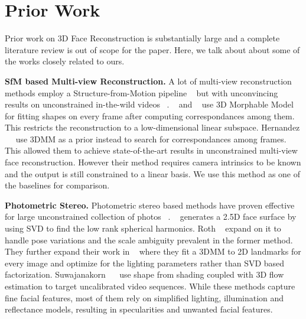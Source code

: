 \documentclass[10pt,twocolumn,letterpaper]{article}
\begin{document}
\section{Prior Work}
Prior work on 3D Face Reconstruction is substantially large and a complete literature review is out of scope for the paper. Here, we talk about about some of the works closely related to ours.

\noindent \textbf{SfM based Multi-view Reconstruction.} A lot of multi-view reconstruction methods employ a Structure-from-Motion pipeline ~\cite{gotardo2015photogeometric, lin2010accurate, fidaleo2007model} but with unconvincing results on unconstrained in-the-wild videos ~\cite{hernandez2017accurate}. ~\cite{brand2001morphable} and ~\cite{shi2014automatic} use 3D Morphable Model~\cite{blanz1999morphable} for fitting shapes on every frame after computing correspondances among them. This restricts the reconstruction to a low-dimensional linear subspace. Hernandez ~\etal ~\cite{hernandez2017accurate} use 3DMM as a prior instead to search for correspondances among frames. This allowed them to achieve state-of-the-art results in unconstrained multi-view face reconstruction. However their method requires camera intrinsics to be known and the output is still constrained to a linear basis. We use this method as one of the baselines for comparison.

\noindent \textbf{Photometric Stereo.} Photometric stereo based methods have proven effective for large unconstrained collection of photos ~\cite{kemelmacher2011face, kemelmacher2013internet, roth2015unconstrained}. ~\cite{kemelmacher2011face} generates a 2.5D face surface by using SVD to find the low rank spherical harmonics. Roth \etal ~\cite{roth2015unconstrained} expand on it to handle pose variations and the scale ambiguity prevalent in the former method. They further expand their work in ~\cite{roth2016adaptive} where they fit a 3DMM to 2D landmarks for every image and optimize for the lighting parameters rather than SVD based factorization. Suwajanakorn ~\etal ~\cite{suwajanakorn2014total} use shape from shading coupled with 3D flow estimation to target uncalibrated video sequences. While these methods capture fine facial features, most of them rely on simplified lighting, illumination and reflectance models, resulting in specularities and unwanted facial features.
\end{document}
